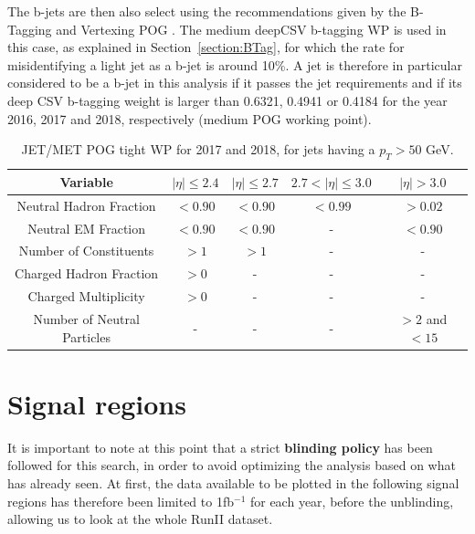 \documentclass[a4paper, 10pt, openright]{report}
\begin{document}
The b-jets are then also select using the recommendations given by the B-Tagging and Vertexing \ac{POG} \cite{BTagPOG}. The medium deepCSV b-tagging \ac{WP} is used in this case, as explained in Section~\ref{section:BTag}, for which the rate for misidentifying a light jet as a b-jet is around 10\%. A jet is therefore in particular considered to be a b-jet in this analysis if it passes the jet requirements and if its deep CSV b-tagging weight is larger than 0.6321, 0.4941 or 0.4184 for the year 2016, 2017 and 2018, respectively (medium \ac{POG} working point).

\begin{table}
\begin{center}
\begin{tabular}{ c|c|c|c|c } 
 \hline
 Variable & $|\eta| \leq 2.4$ & $|\eta| \leq 2.7$ & $2.7 < |\eta| \leq 3.0$ & $|\eta| > 3.0$ \\
\hline
Neutral Hadron Fraction & $< 0.90$ & $< 0.90$ & $< 0.99$ & $> 0.02$ \\
Neutral EM Fraction & $< 0.90$ & $< 0.90$ & - & $< 0.90$ \\
Number of Constituents & $> 1$ & $> 1$ & - & - \\
Charged Hadron Fraction & $> 0$ & - & - & - \\
Charged Multiplicity & $> 0$ & - & - & - \\
Number of Neutral Particles & - & - & - & $> 2$ and $< 15$ \\
\hline
\end{tabular}
\caption{JET/MET \ac{POG} tight \ac{WP} for 2017 and 2018, for jets having a $p_T > 50$ GeV.}
\label{table:JetSelPU}
\end{center}
\end{table}

\section{Signal regions} \label{section:SR}

It is important to note at this point that a strict \textbf{blinding policy} has been followed for this search, in order to avoid optimizing the analysis based on what has already seen. At first, the data available to be plotted in the following signal regions has therefore been limited to 1fb$^{-1}$ for each year, before the unblinding, allowing us to look at the whole RunII dataset.
\end{document}
